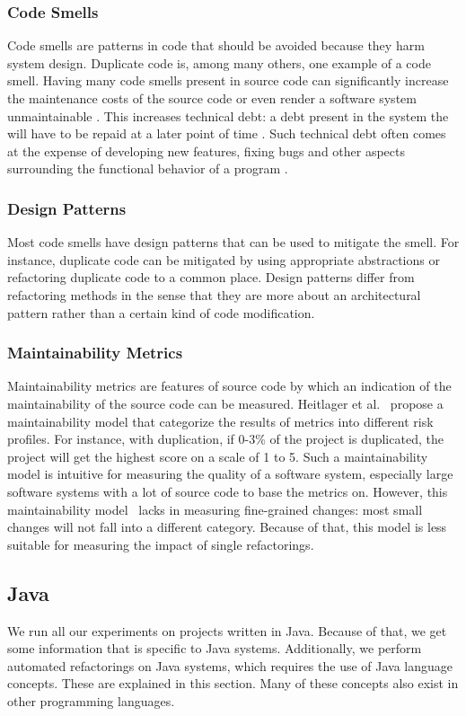 \subsubsection{Code Smells}
Code smells are patterns in code that should be avoided because they harm system design. Duplicate code is, among many others, one example of a code smell. Having many code smells present in source code can significantly increase the maintenance costs of the source code or even render a software system unmaintainable \cite{heitlager2007practical}. This increases technical debt: a debt present in the system the will have to be repaid at a later point of time \cite{tom2013exploration}. Such technical debt often comes at the expense of developing new features, fixing bugs and other aspects surrounding the functional behavior of a program \cite{kruchten2012technical}.

\subsubsection{Design Patterns}
Most code smells have design patterns that can be used to mitigate the smell. For instance, duplicate code can be mitigated by using appropriate abstractions or refactoring duplicate code to a common place. Design patterns differ from refactoring methods in the sense that they are more about an architectural pattern rather than a certain kind of code modification.

\subsubsection{Maintainability Metrics}
Maintainability metrics are features of source code by which an indication of the maintainability of the source code can be measured. Heitlager et al.~\cite{heitlager2007practical} propose a maintainability model that categorize the results of metrics into different risk profiles. For instance, with duplication, if 0-3\% of the project is duplicated, the project will get the highest score on a scale of 1 to 5. Such a maintainability model is intuitive for measuring the quality of a software system, especially large software systems with a lot of source code to base the metrics on. However, this maintainability model~\cite{heitlager2007practical} lacks in measuring fine-grained changes: most small changes will not fall into a different category. Because of that, this model is less suitable for measuring the impact of single refactorings.

\subsection{Java}
We run all our experiments on projects written in Java. Because of that, we get some information that is specific to Java systems. Additionally, we perform automated refactorings on Java systems, which requires the use of Java language concepts. These are explained in this section. Many of these concepts also exist in other programming languages.


